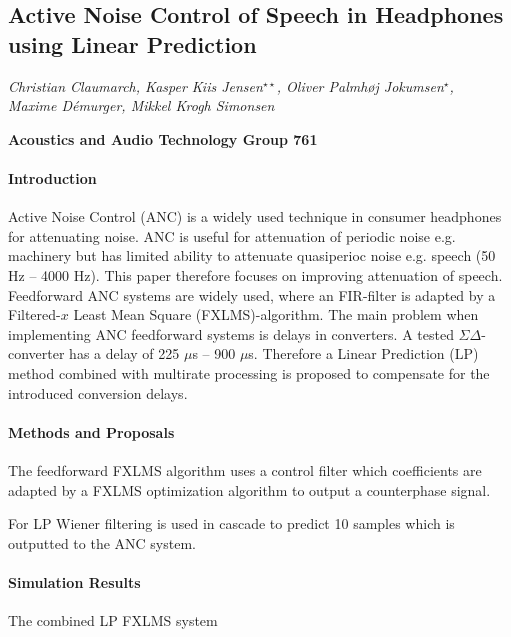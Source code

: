 \documentclass[a4paper]{article}
\title{}
\begin{document}
	
	{\centering
		\subsection*{Active Noise Control of Speech in Headphones using Linear Prediction}}
	
	{\centering
		\textit{Christian Claumarch, Kasper Kiis Jensen$^{\star \star}$, Oliver Palmhøj Jokumsen$^{\star}$, \\Maxime Démurger, Mikkel Krogh Simonsen}
		\par}
	{\centering
		\textbf{Acoustics and Audio Technology Group 761}
		\par}
	
	\bigskip
	
	\paragraph{Introduction} 
	Active Noise Control (ANC) is a widely used technique in consumer headphones for attenuating noise. ANC is useful for attenuation of periodic noise e.g. machinery but has limited ability to attenuate quasiperioc noise e.g. speech (50 Hz -- 4000 Hz). This paper therefore focuses on improving attenuation of speech. Feedforward ANC systems are widely used, where an FIR-filter is adapted by a Filtered-$x$ Least Mean Square (FXLMS)-algorithm. The main problem when implementing ANC feedforward systems is delays in converters. A tested $\Sigma\Delta$-converter has a delay of 225 $\mu$s -- 900 $\mu$s. Therefore a Linear Prediction (LP) method combined with multirate processing is proposed to compensate for the introduced conversion delays.

	\paragraph{Methods and Proposals}
	The feedforward FXLMS algorithm uses a control filter which coefficients are adapted by a FXLMS optimization algorithm to output a counterphase signal.  

	For LP Wiener filtering is used in cascade to predict 10 samples which is outputted to the ANC system.  

	\paragraph{Simulation Results}
	The combined LP FXLMS system 
\end{document}
